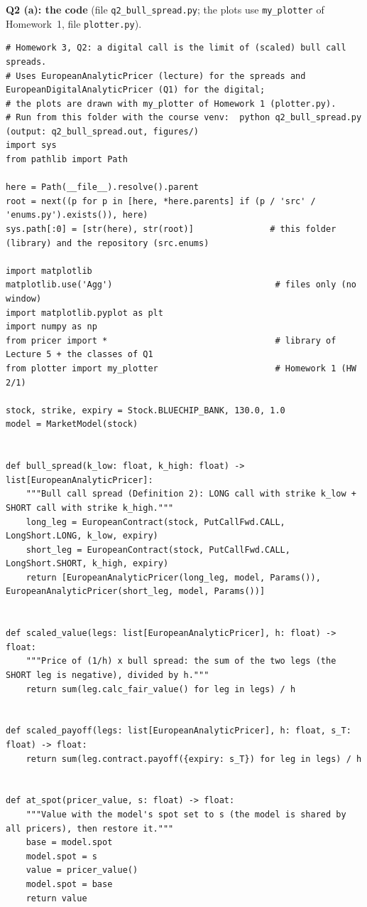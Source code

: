 \documentclass[11pt,a4paper]{article}
\newcommand{\step}[1]{\par\smallskip\noindent\textbf{#1}\enspace\ignorespaces}
\begin{document}
\step{Q2 (a): the code} (file \texttt{q2\_bull\_spread.py}; the plots use \texttt{my\_plotter} of Homework~1, file \texttt{plotter.py}).
\begin{lstlisting}[style=pysmall]
# Homework 3, Q2: a digital call is the limit of (scaled) bull call spreads.
# Uses EuropeanAnalyticPricer (lecture) for the spreads and EuropeanDigitalAnalyticPricer (Q1) for the digital;
# the plots are drawn with my_plotter of Homework 1 (plotter.py).
# Run from this folder with the course venv:  python q2_bull_spread.py   (output: q2_bull_spread.out, figures/)
import sys
from pathlib import Path

here = Path(__file__).resolve().parent
root = next((p for p in [here, *here.parents] if (p / 'src' / 'enums.py').exists()), here)
sys.path[:0] = [str(here), str(root)]               # this folder (library) and the repository (src.enums)

import matplotlib
matplotlib.use('Agg')                                # files only (no window)
import matplotlib.pyplot as plt
import numpy as np
from pricer import *                                 # library of Lecture 5 + the classes of Q1
from plotter import my_plotter                       # Homework 1 (HW 2/1)

stock, strike, expiry = Stock.BLUECHIP_BANK, 130.0, 1.0
model = MarketModel(stock)


def bull_spread(k_low: float, k_high: float) -> list[EuropeanAnalyticPricer]:
    """Bull call spread (Definition 2): LONG call with strike k_low + SHORT call with strike k_high."""
    long_leg = EuropeanContract(stock, PutCallFwd.CALL, LongShort.LONG, k_low, expiry)
    short_leg = EuropeanContract(stock, PutCallFwd.CALL, LongShort.SHORT, k_high, expiry)
    return [EuropeanAnalyticPricer(long_leg, model, Params()), EuropeanAnalyticPricer(short_leg, model, Params())]


def scaled_value(legs: list[EuropeanAnalyticPricer], h: float) -> float:
    """Price of (1/h) x bull spread: the sum of the two legs (the SHORT leg is negative), divided by h."""
    return sum(leg.calc_fair_value() for leg in legs) / h


def scaled_payoff(legs: list[EuropeanAnalyticPricer], h: float, s_T: float) -> float:
    return sum(leg.contract.payoff({expiry: s_T}) for leg in legs) / h


def at_spot(pricer_value, s: float) -> float:
    """Value with the model's spot set to s (the model is shared by all pricers), then restore it."""
    base = model.spot
    model.spot = s
    value = pricer_value()
    model.spot = base
    return value



\end{lstlisting}
\end{document}
